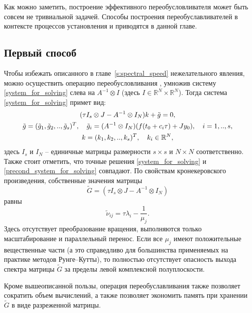 \documentclass[a4paper,14pt]{extreport}
\begin{document}
	Как можно заметить, построение эффективного переобусловливателя может быть совсем не тривиальной задачей. Способы построения переобуславливателей в контексте процессов установления и приводятся в данной главе.
    
  \subsection{Первый способ}
  \label{ss:precond_1}
  Чтобы  избежать описанного в главе~\ref{s:spectral_speed} нежелательного явления, можно осуществить операцию переобусловливания \cite{gomel},\cite{konf_may}  умножив систему \eqref{system_for_solving} слева на $A^{-1}\otimes I$ (здесь $I\in \mathbb{R}^N \times \mathbb{R}^N $). Тогда система \eqref{system_for_solving} примет вид:
\begin{gather}\label{precond_system_for_solving}
(\tau I_s\otimes J-A^{-1}\otimes I_N)k+\tilde g=0,\\
\notag \tilde g=(\tilde g_1,\tilde g_2,..,\tilde g_s)^T, \quad \tilde g_i=(A^{-1}\otimes I_N)(f(t_0+c_i \tau)+Jy_0), \quad i=1,..,s,\\
\notag k=(k_1,k_2,..,k_s)^T, \quad k_i \in \mathbb{R}^N,
\end{gather}
здесь $I_s$ и $I_N$ -- единичные матрицы размерности $s\times s$ и
$N \times N$ соответственно. Также стоит отметить, что точные
решения \eqref{system_for_solving} и
\eqref{precond_system_for_solving} совпадают. По свойствам
кронекеровского произведения, собственные значения
матрицы
$$\tilde G =(\tau I_s\otimes J-A^{-1}\otimes I_N) $$
равны
$$\tilde \nu_{ij} = \tau \lambda_i - \frac{1}{ \mu_j}.$$
Здесь отсутствует преобразование вращения, выполняются только
масштабирование и параллельный перенос.  Если все $\mu_j$ имеют
положительные вещественные части (а это справедливо для большинства
применяемых на практике методов Рунге--Кутты), то полностью
отсутствует опасность выхода спектра матрицы $\tilde G$ за пределы
левой комплексной полуплоскости. 

Кроме вышеописанной пользы, операция переобуславливания также позволяет сократить объем вычислений, а также позволяет экономить память при хранении $\tilde G$ в виде разреженной матрицы\cite{Bondar}.
  
\end{document}

